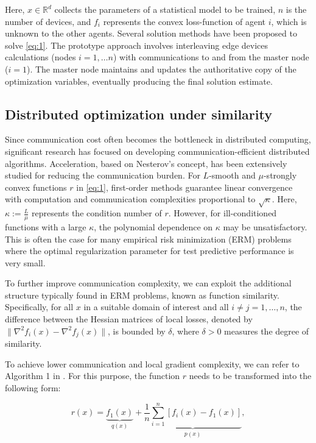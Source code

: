 \documentclass{article}
\begin{document}
Here, $x\in\mathbb{R}^d$ collects the parameters of a statistical model to be trained, $n$ is the number of devices, and $f_i$ represents the convex loss-function of agent $i$, which is unknown to the other agents. Several solution methods have been proposed to solve \ref{eq:1}. The prototype approach involves interleaving edge devices calculations (nodes $i = 1, \ldots n$) with communications to and from the master node ($i = 1$). The master node maintains and updates the authoritative copy of the optimization variables, eventually producing the final solution estimate.

\subsection{Distributed optimization under similarity}

Since communication cost often becomes the bottleneck in distributed computing, significant research has focused on developing communication-efficient distributed algorithms. Acceleration, based on Nesterov's concept, has been extensively studied for reducing the communication burden. For $L$-smooth and $\mu$-strongly convex functions $r$ in \ref{eq:1}, first-order methods guarantee linear convergence with computation and communication complexities proportional to $\sqrt{\kappa}$. Here, $\kappa := \frac{L}{\mu}$ represents the condition number of $r$. However, for ill-conditioned functions with a large $\kappa$, the polynomial dependence on $\kappa$ may be unsatisfactory. This is often the case for many empirical risk minimization (ERM) problems where the optimal regularization parameter for test predictive performance is very small.

To further improve communication complexity, we can exploit the additional structure typically found in ERM problems, known as function similarity. Specifically, for all $x$ in a suitable domain of interest and all $i \neq j = 1,\ldots,n$, the difference between the Hessian matrices of local losses, denoted by $\|\nabla ^2 f_i(x) - \nabla ^2 f_j(x)\|$, is bounded by $\delta$, where $\delta > 0$ measures the degree of similarity.

To achieve lower communication and local gradient complexity, we can refer to Algorithm 1 in \cite{kovalev2022optimal}. For this purpose, the function $r$ needs to be transformed into the following form:

\begin{equation}
    \label{eq:2}
    r(x) = \underbrace{f_1(x)}_{q(x)} + \underbrace{\frac{1}{n}\sum\limits_{i = 1}^{n}[f_i(x) - f_1(x)]}_{p(x)},
\end{equation}
\end{document}
